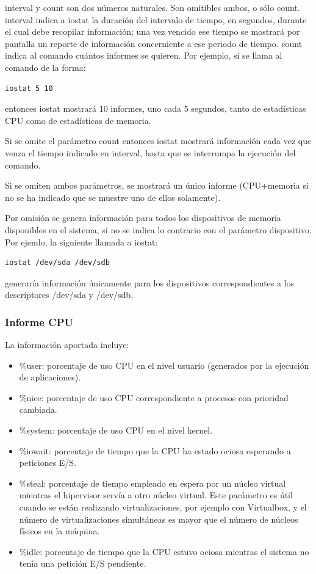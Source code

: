 \documentclass[a4paper,10pt]{article}
\renewcommand{\texttt}[2][black!60]{\textcolor{#1}{\ttfamily #2}}
\begin{document}
\texttt{interval} y \texttt{count} son dos números naturales. Son omitibles ambos, o sólo \texttt{count}. \texttt{interval} indica
a \texttt{iostat} la duración del intervalo de tiempo, en segundos, durante el cual debe recopilar información; una vez vencido
ese tiempo se mostrará por pantalla un reporte de información concerniente a ese periodo de tiempo. \texttt{count} indica al comando
cuántos informes se quieren. Por ejemplo, si se llama al comando de la forma:

\begin{lstlisting}[style=BashInputStyle]
  iostat 5 10
\end{lstlisting}
  
entonces \texttt{iostat} mostrará 10 informes, uno cada 5 segundos, tanto de estadísticas CPU como de estadísticas de memoria.

Si se omite el parámetro \texttt{count} entonces \texttt{iostat} mostrará información cada vez que venza el tiempo indicado en \texttt{interval},
hasta que se interrumpa la ejecución del comando.

Si se omiten ambos parámetros, se mostrará un único informe (CPU+memoria si no se ha indicado que se muestre uno de ellos solamente).

Por omisión se genera información para todos los dispositivos de memoria disponibles en el sistema, si no se indica lo contrario
con el parámetro \texttt{dispositivo}. Por ejemlo, la siguiente llamada a \texttt{iostat}:

\begin{lstlisting}[style=BashInputStyle]
  iostat /dev/sda /dev/sdb
\end{lstlisting}

generaría información únicamente para los dispositivos correspondientes a los descriptores \texttt{/dev/sda} y \texttt{/dev/sdb}.

\subsubsection{Informe CPU}
La información aportada incluye:
\begin{itemize}
 \item \texttt{\%user}: porcentaje de uso CPU en el nivel usuario (generados por la ejecución de aplicaciones).
 \item \texttt{\%nice}: porcentaje de uso CPU correspondiente a procesos con prioridad cambiada.
 \item \texttt{\%system}: porcentaje de uso CPU en el nivel kernel.
 \item \texttt{\%iowait}: porcentaje de tiempo que la CPU ha estado ociosa esperando a peticiones E/S.
 \item \texttt{\%steal}: porcentaje de tiempo empleado en espera por un núcleo virtual mientras el hipervisor servía a otro
 núcleo virtual. Este parámetro es útil cuando se están realizando virtualizaciones, por ejemplo con Virtualbox, y el número de
 virtualizaciones simultáneas es mayor que el número de núcleos físicos en la máquina.
 \item \texttt{\%idle}: porcentaje de tiempo que la CPU estuvo ociosa mientras el sistema no tenía una petición E/S pendiente.
\end{itemize}
\end{document}
